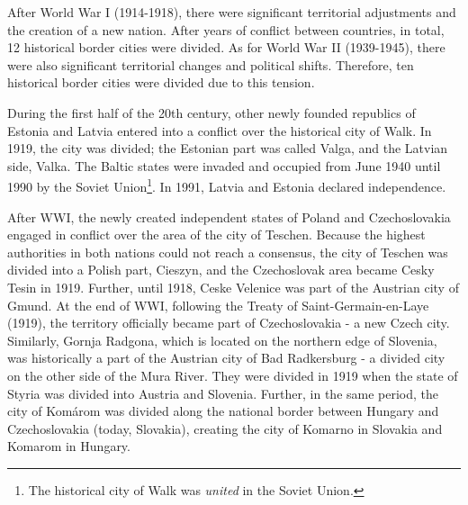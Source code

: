 \documentclass[12pt]{article}    %
\begin{document}
\par  After World War I (1914-1918), there were significant territorial adjustments and the creation of a new nation. After years of conflict between countries, in total, 12 historical border cities were divided. As for World War II (1939-1945), there were also significant territorial changes and political shifts. Therefore, ten historical border cities were divided due to this tension. 

\par During the first half of the 20th century, other newly founded republics of Estonia and Latvia entered into a conflict over the historical city of Walk. In 1919, the city was divided; the Estonian part was called Valga, and the Latvian side, Valka. The Baltic states were invaded and occupied from June 1940 until 1990 by the Soviet Union\footnote{The historical city of Walk was \textit{united} in the Soviet Union.}. In 1991, Latvia and Estonia declared independence. 


\par After WWI, the newly created independent states of Poland and Czechoslovakia engaged in conflict over the area of the city of Teschen. Because the highest authorities in both nations could not reach a consensus, the city of Teschen was divided into a Polish part, Cieszyn, and the Czechoslovak area became Cesky Tesin in 1919. Further, until 1918, Ceske Velenice was part of the Austrian city of Gmund. At the end of WWI, following the Treaty of Saint-Germain-en-Laye (1919), the territory officially became part  of Czechoslovakia  - a new Czech city. Similarly, Gornja Radgona, which is located on the northern edge of Slovenia, was historically a part of the Austrian city of Bad Radkersburg - a divided city on the other side of the Mura River. They were divided in 1919 when the state of Styria was divided into Austria and Slovenia. Further, in the same period, the city of Komárom was divided along the national border between Hungary and Czechoslovakia (today, Slovakia), creating the city of Komarno in Slovakia and Komarom in Hungary. 
\end{document}
